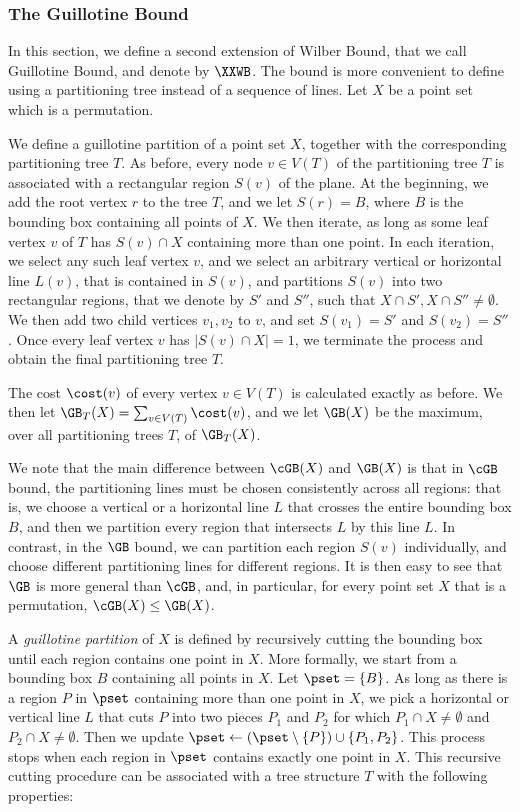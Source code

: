 \documentclass{toc}
\begin{document}
\subsubsection{The Guillotine Bound}

In this section, we define a second extension of Wilber Bound, that we call Guillotine Bound, and denote by $\XXWB$. The bound is more convenient to define using a partitioning tree instead of a sequence of lines. 
Let $X$ be a point set which is a permutation.  

We define a guillotine partition of a point set $X$, together with the corresponding partitioning tree $T$. 
As before, every node $v\in V(T)$ of the partitioning tree $T$ is associated with a rectangular region $S(v)$ of the plane. At the beginning, we add the root vertex $r$ to the tree $T$, and we let $S(r)=B$, where $B$ is the bounding box containing all points of $X$. We then iterate, as long as some leaf vertex $v$ of $T$ has $S(v)\cap X$ containing more than one point. In each iteration, we select any such leaf vertex $v$, and we select an arbitrary vertical or horizontal line $L(v)$, that is contained in $S(v)$, and partitions $S(v)$ into two rectangular regions, that we denote by $S'$ and $S''$, such that $X\cap S',X\cap S''\neq \emptyset$. We then add two child vertices $v_1,v_2$ to $v$, and set $S(v_1)=S'$ and $S(v_2)=S''$. Once every leaf vertex $v$ has $|S(v)\cap X|=1$, we terminate the process and obtain the final partitioning tree $T$.

The cost $\cost(v)$ of every vertex $v\in V(T)$ is calculated exactly as before. We then let $\GB_T(X)=\sum_{v\in V(T)}\cost(v)$, and we let $\GB(X)$ be the maximum, over all partitioning trees $T$, of $\GB_T(X)$. 

We note that the main difference between $\cGB(X)$ and $\GB(X)$ is that in $\cGB$ bound, the partitioning lines must be chosen consistently across all regions: that is, we choose a vertical or a horizontal line $L$ that crosses the entire bounding box $B$, and then we partition every region that intersects $L$ by this line $L$. In contrast, in the $\GB$ bound, we can partition each region $S(v)$ individually, and choose different partitioning lines for different regions. It is then easy to see that $\GB$ is more general than $\cGB$, and, in particular, for every point set $X$ that is a permutation, $\cGB(X)\leq \GB(X)$.

\iffalse

A \emph{guillotine partition} of $X$ is defined by recursively cutting the bounding box until each region contains one point in $X$. 
More formally, we start from a bounding box $B$ containing all points in $X$. 
Let $\pset = \{B\}$. 
As long as there is a region $P$ in $\pset$ containing more than one point in $X$, we pick a horizontal or vertical line $L$ that cuts $P$ into two pieces $P_1$ and $P_2$ for which $P_1 \cap X \neq \emptyset$ and $P_2 \cap X \neq \emptyset$.
Then we update $\pset \leftarrow (\pset \setminus \{P\}) \cup \{P_1, P_2 \}$.   
This process stops when each region in $\pset$ contains exactly one point in $X$. 
This recursive cutting procedure can be associated with a tree structure $T$ with the following properties: 
\end{document}

